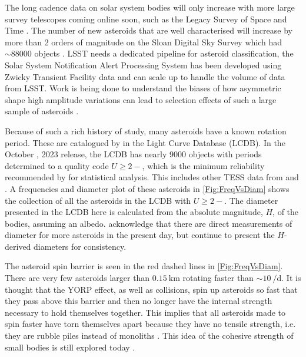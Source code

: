 \documentclass{UCreport}
\begin{document}
The long cadence data on solar system bodies will only increase with more large survey telescopes coming online soon, such as the Legacy Survey of Space and Time \citep[LSST][]{LSST2019}.
The number of new asteroids that are well characterised will increase by more than 2 orders of magnitude on the Sloan Digital Sky Survey \citep[SDSS][]{York2000} which had $\sim 88000$ objects \citet{Parker2008}.
LSST needs a dedicated pipeline for asteroid classification, the Solar System Notification Alert Processing System \citep[SNAPS][]{Trilling2023} has been developed using Zwicky Transient Facility \citep[ZTF, ][]{Bellm2018} data and can scale up to handle the volume of data from LSST.
Work is being done to understand the biases of how  asymmetric shape high amplitude variations can lead to selection effects of such a large sample of asteroids \citet{Levine2023}.

Because of such a rich history of study, many asteroids have a known rotation period.
These are catalogued by \citet{Warner2009} in the Light Curve Database (LCDB).
In the October , 2023 release, the LCDB has nearly 9000 objects with periods determined to a quality code $U\geq 2-$, which is the minimum reliability recommended by \citeauthor{Warner2009} for statistical analysis.
This includes other TESS data from \citet{Pal2020} and \citet{Woods2021}.
A frequencies and diameter plot of these asteroids in \autoref{Fig:FreqVsDiam} shows the collection of all the asteroids in the LCDB with $U\geq 2-$.
The diameter presented in the LCDB here is calculated from the absolute magnitude, $H$, of the bodies, assuming an albedo.
\citeauthor{Warner2009} acknowledge that there are direct measurements of diameter for more asteroids in the present day, but continue to present the $H$-derived diameters for consistency.

The asteroid spin barrier \citep{Pravec2000} is seen in the red dashed lines in \autoref{Fig:FreqVsDiam}.
There are very few asteroids larger than $\qty{0.15}{\kilo\metre}$ rotating faster than $\sim \qty{10}{\per\day}$.
It is thought that the YORP effect, as well as collisions, spin up asteroids so fast that they pass above this barrier and then no longer have the internal strength necessary to hold themselves together.
This implies that all asteroids made to spin faster have torn themselves apart because they have no tensile strength, i.e. they are rubble piles instead of monoliths \citep{Harris1996}.
This idea of the cohesive strength of small bodies is still explored today \citep[e.g.][for V-type asteroids]{Oszkiewicz2020}.
\end{document}
